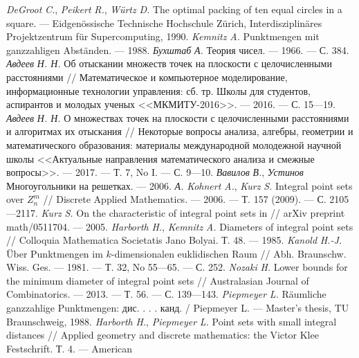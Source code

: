 \begin{thebibliography}{99}
\textsl{DeGroot} \textsl{C.}, \textsl{Peikert} \textsl{R.},
\textsl{W\"{u}rtz} \textsl{D.} The optimal packing of ten equal
circles in a square. --- Eidgen\"{o}ssische Technische Hochschule
Z\"{u}rich, Interdisziplin\"{a}res Projektzentrum f\"{u}r Supercomputing,
1990.
\textsl{Kemnitz} \textsl{A.} Punktmengen mit ganzzahligen
Abst\"{a}nden. --- 1988.
\textsl{Бухштаб} \textsl{А.} Теория чисел. --- 1966. --- С. 384.
\textsl{Авдеев} \textsl{Н. Н.} Об отыскании множеств точек на
плоскости с целочисленными расстояниями /\!/ Математическое
и компьютерное моделирование, информационные технологии
управления: сб. тр. Школы для студентов, аспирантов и
молодых ученых <<МКМИТУ-2016>>. --- 2016. --- С. 15---19.
\textsl{Авдеев} \textsl{Н. Н.} О множествах точек на
плоскости с целочисленными расстояниями и алгоритмах их
отыскания /\!/ Некоторые вопросы анализа, алгебры, геометрии
и математического образования: материалы международной
молодежной научной школы <<Актуальные направления
математического анализа и смежные вопросы>>. --- 2017. --- Т. 7,
No I. --- С. 9---10.
\textsl{Вавилов} \textsl{В.}, \textsl{Устинов}
Многоугольники на решетках. --- 2006.
\textsl{А.}
\textsl{Kohnert} \textsl{A.}, \textsl{Kurz} \textsl{S.} Integral
point sets over $Z^m_n$
/\!/ Discrete Applied Mathematics. --- 2006. ---
Т. 157 (2009). --- С. 2105---2117.
\textsl{Kurz} \textsl{S.} On the characteristic of integral point
sets in /\!/ arXiv preprint math/0511704. --- 2005.
\textsl{Harborth} \textsl{H.}, \textsl{Kemnitz} \textsl{A.}
Diameters of integral point sets /\!/ Colloquia Mathematica
Societatis Jano Bolyai. Т. 48. --- 1985.
\textsl{Kanold}
\textsl{H.-J.}
\"{U}ber
Punktmengen
im
$k$-dimensionalen euklidischen Raum /\!/ Abh. Braunschw. Wiss.
Ges. --- 1981. --- Т. 32, No 55---65. --- С. 252.
\textsl{Nozaki} \textsl{H.} Lower bounds for the minimum
diameter of integral point sets /\!/ Australasian Journal of
Combinatorics. --- 2013. --- Т. 56. --- С. 139---143.
\textsl{Piepmeyer}
\textsl{L.}
R\"{a}umliche
ganzzahlige
Punktmengen: дис. . . . канд. / Piepmeyer L. --- Master’s
thesis, TU Braunschweig, 1988.
\textsl{Harborth} \textsl{H.}, \textsl{Piepmeyer} \textsl{L.}
Point sets with small integral distances /\!/ Applied geometry and
discrete mathematics: the Victor Klee Festschrift. Т. 4. --- American

\end{thebibliography}
